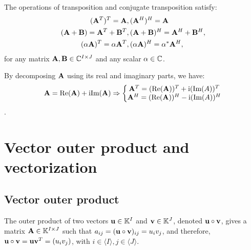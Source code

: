 \begin{proposition}{}{}
    The operations of transposition and conjugate transposition satisfy:
    \begin{align*}
        (\bold{A}^T)^T=\bold{A}&, (\bold{A}^H)^H=\bold{A}\\
        (\bold{A}+\bold{B})=\bold{A}^T+\bold{B}^T&, (\bold{A}+\bold{B})^{H}=\bold{A}^H+\bold{B}^H,\\
        (\alpha \bold{A})^T=\alpha \bold{A}^T&, (\alpha \bold{A})^H=\alpha^*\bold{A}^H, 
    \end{align*}
    for any matrix $\bold{A},\bold{B}\in\mathbb{C}^{I\times J}$ and any scalar $\alpha\in\mathbb{C}$.
\end{proposition}

\begin{remark}
    By decomposing $\bold{A}$ using its real and imaginary parts, we have:
    \begin{align*}
        \bold{A}=\text{Re}(\bold{A}) +\text{i} \text{Im} (\bold{A}) \Rightarrow 
        \left\{\begin{matrix}
           \bold{A}^T = (\text{Re}(\bold{A}))^T+\text{i} (\text{Im}(A))^T \\
           \bold{A}^H = (\text{Re}(\bold{A}))^H-\text{i} (\text{Im}(A))^H
          \end{matrix}\right.
    \end{align*}.
\end{remark}


\section{Vector outer product and vectorization}
\subsection{Vector outer product}
The outer product of two vectors $\bold{u}\in\mathbb{K}^{I}$ and $\bold{v}\in \mathbb{K}^{J}$,
denoted $\bold{u}\circ \bold{v}$,
gives a matrix $\bold{A}\in \mathbb{K}^{I\times J}$
such that $a_{ij}=(\bold{u}\circ\bold{v})_{ij}=u_iv_j$,
and therefore, $\bold{u}\circ\bold{v}=\bold{u}\bold{v}^T=(u_iv_j)$, 
with $i\in \langle I\rangle,j\in\langle J\rangle$.


